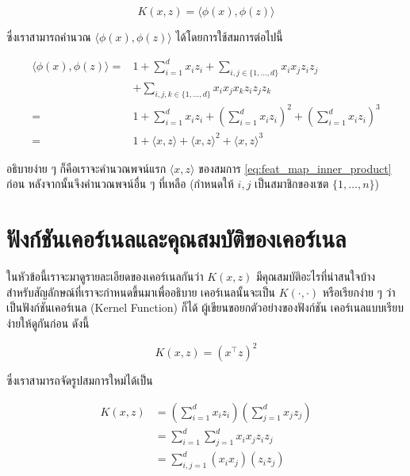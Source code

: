 \begin{equation}\label{eq:kernel}
    K(x,z) = \langle\phi(x),\phi(z)\rangle
\end{equation}

\noindent ซึ่งเราสามารถคำนวณ $\langle\phi(x),\phi(z)\rangle$ ได้โดยการใช้สมการต่อไปนี้

\begin{align}
    \langle\phi(x),\phi(z)\rangle =& 1 + \sum_{i=1}^d x_i z_i + 
    \sum_{i,j\in\{1,\ldots,d\}} x_i x_j z_i z_j \nonumber \\
    &+ \sum_{i,j,k \in \{1,\ldots,d\}} x_i x_j x_k z_i z_j z_k \\
    =& 1 + \sum_{i=1}^d x_i z_i + \left(\sum_{i=1}^d x_i z_i \right)^2 + \left( \sum_{i=1}^d x_i z_i \right)^3 \\
    =& 1 + \langle x,z \rangle + \langle x,z \rangle^2 + \langle x,z \rangle^3\label{eq:feat_map_inner_product}
\end{align}

\noindent อธิบายง่าย ๆ ก็คือเราจะคำนวณพจน์แรก $\langle x,z \rangle$ ของสมการ \ref{eq:feat_map_inner_product} ก่อน 
หลังจากนั้นจึงคำนวณพจน์อื่น ๆ ที่เหลือ (กำหนดให้ $i,j$ เป็นสมาชิกของเซต $\{1, \dots, n\}$)

\section{ฟังก์ชันเคอร์เนลและคุณสมบัติของเคอร์เนล}
\label{sec:func_kernel}

ในหัวข้อนี้เราจะมาดูรายละเอียดของเคอร์เนลกันว่า $K(x,z)$ มีคุณสมบัติอะไรที่น่าสนใจบ้าง สำหรับสัญลักษณ์ที่เราจะกำหนดขึ้นมาเพื่ออธิบาย%
เคอร์เนลนั้นจะเป็น $K(\cdot,\cdot)$ หรือเรียกง่าย ๆ ว่าเป็นฟังก์ชันเคอร์เนล (Kernel Function) ก็ได้ ผู้เขียนขอยกตัวอย่างของฟังก์ชัน%
เคอร์เนลแบบเรียบง่ายให้ดูกันก่อน ดังนี้

\begin{equation}
    K(x,z) = (x^{\top} z)^{2}
\end{equation}

\noindent ซึ่งเราสามารถจัดรูปสมการใหม่ได้เป็น

\begin{align}
    K(x,z) &= \left( \sum_{i=1}^d x_i z_i \right) \left( \sum_{j=1}^d x_j z_j \right)\\
    &= \sum_{i=1}^d \sum_{j=1}^d x_i x_j z_i z_j\\
    &= \sum_{i,j=1}^d (x_i x_j)(z_i z_j)
\end{align}

